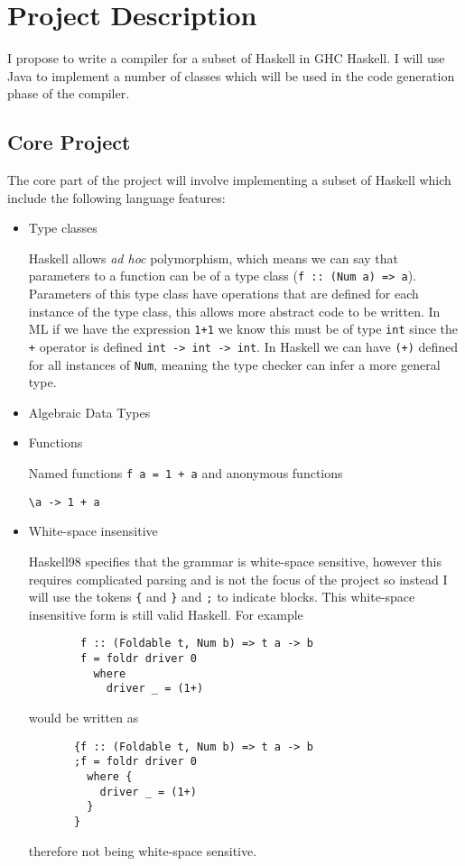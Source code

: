 \documentclass[a4paper]{article}
\begin{document}
\section*{Project Description}
  I propose to write a compiler for a subset of Haskell in GHC Haskell. I will use Java to implement a number of classes which will be used in the 
  code generation phase of the compiler.

  \subsection*{Core Project}

  The core part of the project will involve implementing a subset of Haskell which include the following language features:
  \begin{itemize}
    \item Type classes
      
      Haskell allows \textit{ad hoc} polymorphism, which means we can say that parameters to a function can be of a type class (\texttt{f :: (Num a) => a}).
      Parameters of this type class have operations that are defined for each instance of the type class, this allows more abstract code to be written.
      In ML if we have the expression \texttt{1+1} we know this must be of type \texttt{int} since the \texttt{+} operator is defined \texttt{int -> int -> int}.
      In Haskell we can have \texttt{(+)} defined for all instances of \texttt{Num}, meaning the type checker can infer a more general type.

    \item Algebraic Data Types 

    \item Functions 

      Named functions
      \texttt{f a = 1 + a}
      and anonymous functions 
      
      \texttt{\textbackslash a -> 1 + a}

    \item White-space insensitive

      Haskell98 specifies that the grammar is white-space sensitive, however this requires complicated parsing and is not the focus of the project so instead I will
      use the tokens \texttt{\{} and \texttt{\}} and \texttt{;} to indicate blocks. This white-space insensitive form is still valid Haskell.
      For example 
      \begin{verbatim}
        f :: (Foldable t, Num b) => t a -> b
        f = foldr driver 0
          where
            driver _ = (1+)
      \end{verbatim} 
      would be written as
      \begin{verbatim}
       {f :: (Foldable t, Num b) => t a -> b
       ;f = foldr driver 0
         where {
           driver _ = (1+)
         }
       }
      \end{verbatim}
      therefore not being white-space sensitive.


\end{itemize}
\end{document}
